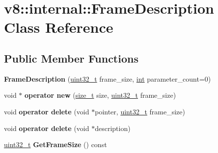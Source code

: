 \hypertarget{classv8_1_1internal_1_1FrameDescription}{}\section{v8\+:\+:internal\+:\+:Frame\+Description Class Reference}
\label{classv8_1_1internal_1_1FrameDescription}
\subsection*{Public Member Functions}
\begin{DoxyCompactItemize}
\item 
\mbox{\label{classv8_1_1internal_1_1FrameDescription_a876a1a844ce8a1ed9843f0bfd00dd4f4}} 
{\bfseries Frame\+Description} (\mbox{\hyperlink{classuint32__t}{uint32\+\_\+t}} frame\+\_\+size, \mbox{\hyperlink{classint}{int}} parameter\+\_\+count=0)
\item 
\mbox{\label{classv8_1_1internal_1_1FrameDescription_adb31357a74efb87f90ea81886d4baa74}} 
void $\ast$ {\bfseries operator new} (\mbox{\hyperlink{classsize__t}{size\+\_\+t}} size, \mbox{\hyperlink{classuint32__t}{uint32\+\_\+t}} frame\+\_\+size)
\item 
\mbox{\label{classv8_1_1internal_1_1FrameDescription_aee5885f86760273016b3e67405389c58}} 
void {\bfseries operator delete} (void $\ast$pointer, \mbox{\hyperlink{classuint32__t}{uint32\+\_\+t}} frame\+\_\+size)
\item 
\mbox{\label{classv8_1_1internal_1_1FrameDescription_ab39a58e397a051f4b77eb31964790891}} 
void {\bfseries operator delete} (void $\ast$description)
\item 
\mbox{\label{classv8_1_1internal_1_1FrameDescription_a4f54ddff9adb06bb475b7a5fd6719eba}} 
\mbox{\hyperlink{classuint32__t}{uint32\+\_\+t}} {\bfseries Get\+Frame\+Size} () const
\item 
\mbox{\label{classv8_1_1internal_1_1FrameDescription_ad0706670dac1b0c2b6452eff67946d1e}} 

\end{DoxyCompactItemize}
